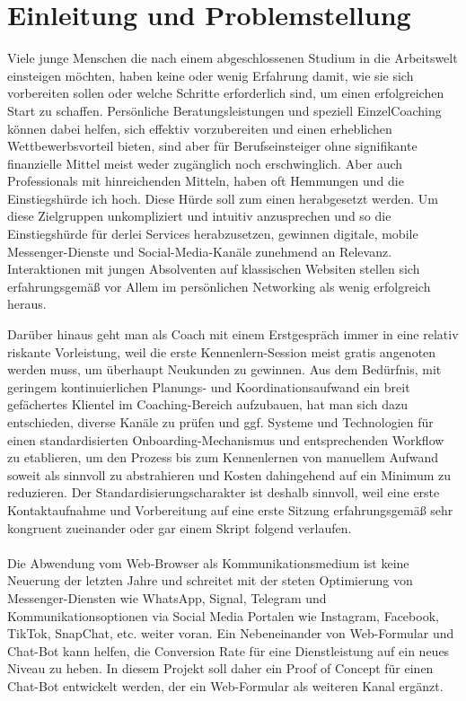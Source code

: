 \chapter{Einleitung und Problemstellung} \label{Einleitung und Problemstellung}
        
    Viele junge Menschen die nach einem abgeschlossenen Studium in die Arbeitswelt einsteigen möchten, haben keine oder wenig Erfahrung damit, wie sie sich vorbereiten sollen oder welche Schritte erforderlich sind, um einen erfolgreichen Start zu schaffen. Persönliche Beratungsleistungen und speziell Einzel\-Coaching können dabei helfen, sich effektiv vorzubereiten und einen erheblichen Wettbewerbsvorteil bieten, sind aber für Berufseinsteiger ohne signifikante finanzielle Mittel meist weder zugänglich noch erschwinglich. Aber auch Professionals mit hinreichenden Mitteln, haben oft Hemmungen und die Einstiegshürde ich hoch. Diese Hürde soll zum einen herabgesetzt werden. Um diese Zielgruppen unkompliziert und intuitiv anzusprechen und so die Einstiegshürde für derlei Services herabzusetzen, gewinnen digitale, mobile Messenger-Dienste und Social-Media-Kanäle zunehmend an Relevanz. Interaktionen mit jungen Absolventen auf klassischen Websiten stellen sich erfahrungsgemäß vor Allem im persönlichen Networking als wenig erfolgreich heraus. 
    
    Darüber hinaus geht man als Coach mit einem Erstgespräch immer in eine relativ riskante Vorleistung, weil die erste Kennenlern-Session meist gratis angenoten werden muss, um überhaupt Neukunden zu gewinnen. 
    Aus dem Bedürfnis, mit geringem kontinuierlichen Planungs- und Koordinationsaufwand ein breit gefächertes Klientel im Coaching-Bereich aufzubauen, hat man sich dazu entschieden, diverse Kanäle zu prüfen und ggf. Systeme und Technologien für einen standardisierten Onboarding-Mechanismus und entsprechenden Workflow zu etablieren, um den Prozess bis zum Kennenlernen von manuellem Aufwand soweit als sinnvoll zu abstrahieren und Kosten dahingehend auf ein Minimum zu reduzieren. Der Standardisierungscharakter ist deshalb sinnvoll, weil eine erste Kontaktaufnahme und Vorbereitung auf eine erste Sitzung erfahrungsgemäß sehr kongruent zueinander oder gar einem Skript folgend verlaufen. \\
    \\
    Die Abwendung vom Web-Browser als Kommunikationsmedium ist keine Neuerung der letzten Jahre und schreitet mit der steten Optimierung von Messenger-Diensten wie WhatsApp, Signal, Telegram und Kommunikationsoptionen via Social Media Portalen wie Instagram, Facebook, TikTok, SnapChat, etc. weiter voran. Ein Nebeneinander von Web-Formular und Chat-Bot kann helfen, die Conversion Rate für eine Dienstleistung auf ein neues Niveau zu heben. \cite{conversion} In diesem Projekt soll daher ein Proof of Concept für einen Chat-Bot entwickelt werden, der ein Web-Formular als weiteren Kanal ergänzt.\\ 
    \\ 
